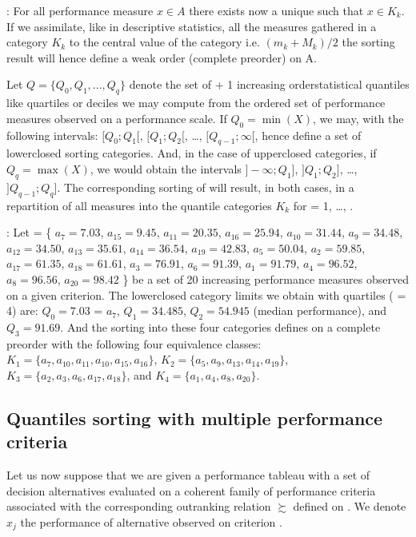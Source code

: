 \documentclass[a4paper,12pt,english]{sphinxhowto}
\begin{document}
: For all performance measure \(x \in A\) there exists now a unique  such that \(x \in K_k\). If we assimilate, like in descriptive statistics, all the measures gathered in a category \(K_k\) to the central value of the category \textendash{} i.e. \((m_k + M_k)/2\) \textendash{} the sorting result will hence define a weak order (complete preorder) on A.

Let \(Q=\{Q_0 , Q_1 , ..., Q_q\}\) denote the set of  + 1 increasing order\sphinxhyphen{}statistical quantiles \textendash{}like quartiles or deciles\textendash{} we may compute from the ordered set  of performance measures observed on a performance scale. If \(Q_0 = \min(X)\), we may, with the following intervals: \([Q_0 ; Q_1 [\), \([Q_1 ; Q_2 [\), …, \([Q_{q-1}; \infty[\), hence define a set of  lower\sphinxhyphen{}closed sorting categories. And, in the case of upper\sphinxhyphen{}closed categories, if \(Q_q = \max(X)\), we would obtain the intervals \(] -\infty; Q_1]\), \(]Q_1 ; Q_2]\), …, \(]Q_{q-1} ; Q_q]\). The corresponding sorting of  will result, in both cases, in a repartition of all measures  into the  quantile categories \(K_k\) for  = 1, …, .

: Let  = \{ \(a_7 = 7.03\), \(a_{15}=9.45\), \(a_{11}= 20.35\), \(a_{16}= 25.94\), \(a_{10}= 31.44\), \(a_9= 34.48\), \(a_{12}= 34.50\), \(a_{13}= 35.61\), \(a_{14}= 36.54\), \(a_{19}= 42.83\), \(a_5= 50.04\), \(a_2= 59.85\), \(a_{17}= 61.35\), \(a_{18}= 61.61\), \(a_3= 76.91\), \(a_6= 91.39\), \(a_1= 91.79\), \(a_4= 96.52\), \(a_8= 96.56\), \(a_{20}= 98.42\) \} be a set of 20 increasing performance measures observed on a given criterion. The lower\sphinxhyphen{}closed category limits we obtain with quartiles ( = 4) are: \(Q_0 = 7.03\) = \(a_7\), \(Q_1= 34.485\), \(Q_2= 54.945\) (median performance), and \(Q_3= 91.69\). And the sorting into these four categories defines on  a complete preorder with the following four equivalence classes: \(K_1=\{a_7,a_{10},a_{11},a_{10},a_{15},a_{16}\}\), \(K_2=\{a_5,a_9,a_{13},a_{14},a_{19}\}\), \(K_3=\{a_2,a_3,a_6,a_{17},a_{18}\}\), and \(K_4=\{a_1,a_4,a_8,a_{20}\}\).


\subsection{Quantiles sorting with multiple performance criteria}
\label{\detokenize{tutorial:quantiles-sorting-with-multiple-performance-criteria}}
Let us now suppose that we are given a performance tableau with a set  of  decision alternatives evaluated on a coherent family of  performance criteria associated with the corresponding outranking relation \(\succsim\) defined on . We denote \(x_j\) the performance of alternative  observed on criterion .
\end{document}
